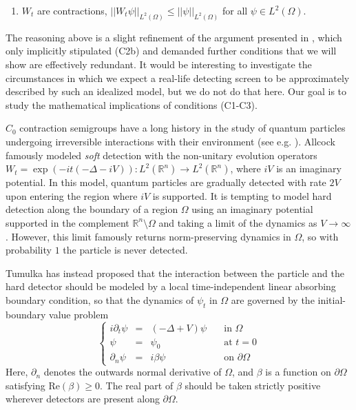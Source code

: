 \documentclass{article}
\numberwithin{equation}{section}
\begin{document}
\begin{enumerate}
    \item[(C3)] $W_t$ are contractions, $||W_t \psi||_{L^2(\Omega)} \leq ||\psi||_{L^2(\Omega)}$ for all $\psi \in L^2(\Omega)$.
\end{enumerate}
The reasoning above is a slight refinement of the argument presented in \cite{TUMULKA2022168910}, which only implicitly stipulated (C2b) and demanded further conditions that we will show are effectively redundant. It would be interesting to investigate the circumstances in which we expect a real-life detecting screen to be approximately described by such an idealized model, but we do not do that here. Our goal is to study the mathematical implications of conditions (C1-C3).


$C_0$ contraction semigroups have a long history in the study of quantum particles undergoing irreversible interactions with their environment (see e.g. \cite{Davies,Exner}). Allcock \cite{ALLCOCK} famously modeled \textit{soft} detection with the non-unitary evolution operators $W_t=\exp(-it(-\Delta -iV)):L^2(\mathbb{R}^n)\to L^2(\mathbb{R}^n)$, where $iV$ is an imaginary potential. In this model, quantum particles are gradually detected with rate $2V$ upon entering the region where $iV$ is supported. It is tempting to model hard detection along the boundary of a region $\Omega$ using an imaginary potential supported in the complement $\mathbb{R}^n\setminus  \Omega$ and taking a limit of the dynamics as $V \to \infty$. However, this limit famously returns norm-preserving dynamics in $\Omega$, so with probability $1$ the particle is never detected.

Tumulka has instead proposed that the interaction between the particle and the hard detector should be modeled by a local time-independent linear absorbing boundary condition, so that the dynamics of $\psi_t$ in $\Omega$ are governed by the initial-boundary value problem
\begin{equation}\label{IBVP}
\left\{\begin{array}{rclr}
       i \partial_t \psi&=& (-\Delta + V) \psi \quad &\text{in } \Omega
       \\
       \psi &=&\psi_0 \quad &\text{at } t=0
       \\
       \partial_n \psi&=&i \beta \psi \quad &\text{on } \partial \Omega
    \end{array}
    \right.
    \end{equation}
Here, $\partial_n$ denotes the outwards normal derivative of $\Omega$, and $\beta$ is a function on $\partial \Omega$ satisfying $\text{Re}(\beta)\geq 0$. The real part of $\beta$ should be taken strictly positive wherever detectors are present along $\partial \Omega$.
\end{document}
